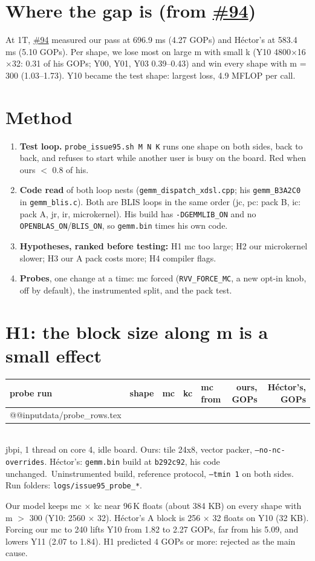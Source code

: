\documentclass[10pt,a4paper]{article}
\newcommand{\iss}[1]{\href{https://github.com/JieGH/RVV_code_gen_via_MLIR_xDSL/issues/#1}{\##1}}
\newcommand{\D}{data}
\newcommand{\note}[1]{\\[2pt]{\footnotesize\color{muted}#1}}
\newcommand{\onet}{jbpi, 1 thread on core 4, idle board. Ours: tile 24x8, vector packer, \texttt{--no-nc-overrides}. H\'ector's: \texttt{gemm.bin} build at \texttt{b292c92}, his code unchanged.}
\begin{document}
\section{Where the gap is (from \iss{94})}
At 1T, \iss{94} measured our pass at 696.9 ms (4.27 GOPs) and H\'ector's at 583.4 ms (5.10 GOPs). Per shape, we lose most on large m with small k (Y10 4800$\times$16$\times$32: 0.31 of his GOPs; Y00, Y01, Y03 0.39--0.43) and win every shape with m = 300 (1.03--1.73). Y10 became the test shape: largest loss, 4.9 MFLOP per call.

\section{Method}
\begin{enumerate}\setlength\itemsep{1pt}
\item \textbf{Test loop.} \texttt{probe\_issue95.sh M N K} runs one shape on both sides, back to back, and refuses to start while another user is busy on the board. Red when ours $<$ 0.8 of his.
\item \textbf{Code read} of both loop nests (\texttt{gemm\_dispatch\_xdsl.cpp}; his \texttt{gemm\_B3A2C0} in \texttt{gemm\_blis.c}). Both are BLIS loops in the same order (jc, pc: pack B, ic: pack A, jr, ir, microkernel). His build has \texttt{-DGEMMLIB\_ON} and no \texttt{OPENBLAS\_ON}/\texttt{BLIS\_ON}, so \texttt{gemm.bin} times his own code.
\item \textbf{Hypotheses, ranked before testing:} H1 mc too large; H2 our microkernel slower; H3 our A pack costs more; H4 compiler flags.
\item \textbf{Probes}, one change at a time: mc forced (\texttt{RVV\_FORCE\_MC}, a new opt-in knob, off by default), the instrumented split, and the pack test.
\end{enumerate}

\section{H1: the block size along m is a small effect}
\begin{center}\small
\begin{tabular}{@{}ll rrl rr@{}}
\toprule
probe run & shape & mc & kc & mc from & ours, GOPs & H\'ector's, GOPs \\
\midrule
\csname @@input\endcsname \D/probe_rows.tex
\bottomrule
\end{tabular}
\note{\onet\ Uninstrumented build, reference protocol, \texttt{--tmin 1} on both sides. Run folders: \texttt{logs/issue95\_probe\_*}.}
\end{center}
Our model keeps mc $\times$ kc near 96\,K floats (about 384 KB) on every shape with m $>$ 300 (Y10: 2560 $\times$ 32). H\'ector's A block is 256 $\times$ 32 floats on Y10 (32 KB). Forcing our mc to 240 lifts Y10 from 1.82 to 2.27 GOPs, far from his 5.09, and lowers Y11 (2.07 to 1.84). H1 predicted 4 GOPs or more: rejected as the main cause.
\end{document}
